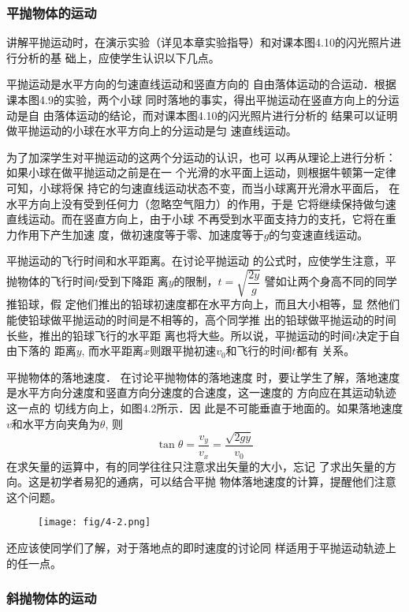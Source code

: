 \subsubsection{平抛物体的运动}

讲解平抛运动时，在演示实验（详见本章实验指导）和对课本图4.10的闪光照片进行分析的基
础上，应使学生认识以下几点。

平抛运动是水平方向的匀速直线运动和竖直方向的
自由落体运动的合运动．根据课本图4.9的实验，两个小球
同时落地的事实，得出平抛运动在竖直方向上的分运动是自
由落体运动的结论，而对课本图4.10的闪光照片进行分析的
结果可以证明做平抛运动的小球在水平方向上的分运动是匀
速直线运动。

为了加深学生对平抛运动的这两个分运动的认识，也可
以再从理论上进行分析：如果小球在做平抛运动之前是在一
个光滑的水平面上运动，则根据牛顿第一定律可知，小球将保
持它的匀速直线运动状态不变，而当小球离开光滑水平面后，
在水平方向上没有受到任何力（忽略空气阻力）的作用，于是
它将继续保持做匀速直线运动。而在竖直方向上，由于小球
不再受到水平面支持力的支托，它将在重力作用下产生加速
度，做初速度等于零、加速度等于$g$的匀变速直线运动。

平抛运动的飞行时间和水平距离。在讨论平抛运动
的公式时，应使学生注意，平抛物体的飞行时间$t$受到下降距
离$y$的限制，$t=\sqrt{\dfrac{2y}{g}}$
譬如让两个身高不同的同学推铅球，假
定他们推出的铅球初速度都在水平方向上，而且大小相等，显
然他们能使铅球做平抛运动的时间是不相等的，高个同学推
出的铅球做平抛运动的时间长些，推出的铅球飞行的水平距
离也将大些。所以说，平抛运动的时间$t$决定于自由下落的
距离$y$, 而水平距离$x$则跟平抛初速$v_0$和飞行的时间$t$都有
关系。

平抛物体的落地速度．
在讨论平抛物体的落地速度
时，要让学生了解，落地速度
是水平方向分速度和竖直方向分速度的合速度，这一速度的
方向应在其运动轨迹这一点的
切线方向上，如图4.2所示．因
此是不可能垂直于地面的。如果落地速度$v$和水平方向夹角为$\theta$, 则\[\tan\theta= \frac{v_y}{v_x}=\frac{\sqrt{2gy}}{v_0} \]
在求矢量的运算中，有的同学往往只注意求出矢量的大小，忘记
了求出矢量的方向。这是初学者易犯的通病，可以结合平抛
物体落地速度的计算，提醒他们注意这个问题。

\begin{figure}[htp]
    \centering
\texttt{[image: fig/4-2.png]}
    \caption{}
\end{figure}

还应该使同学们了解，对于落地点的即时速度的讨论同
样适用于平抛运动轨迹上的任一点。

\subsubsection{斜抛物体的运动}

